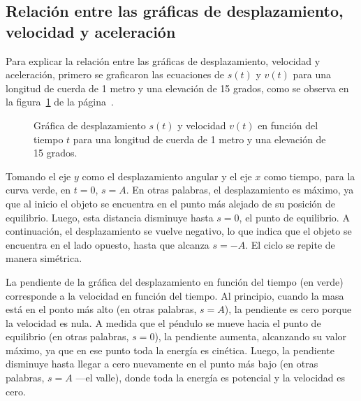 \documentclass[letterpaper]{report}
\numberwithin{table}{section}
\begin{document}
\subsection{Relación entre las gráficas de desplazamiento, velocidad y
aceleración}

Para explicar la relación entre las gráficas de desplazamiento, velocidad y
aceleración, primero se graficaron las ecuaciones de $s(t)$ y $v(t)$
para una longitud de cuerda de 1 metro y una elevación de 15 grados,
como se observa en la figura~\ref{fig:desplazamiento_velocidad} de la
página~\pageref{fig:desplazamiento_velocidad}.

\begin{figure}[ht]
  \centering
  \caption{Gráfica de desplazamiento $s(t)$ y velocidad $v(t)$ en
    función del tiempo $t$ para una
    longitud de cuerda de 1 metro y una elevación de 15
  grados.}\label{fig:desplazamiento_velocidad}
\end{figure}

Tomando el eje $y$ como el desplazamiento angular y el eje $x$ como
tiempo, para la curva verde, en $t=0$, $s=A$. En otras palabras, el
desplazamiento es máximo, ya que al inicio el objeto se encuentra en
el punto más alejado de su posición de equilibrio. Luego, esta
distancia disminuye hasta $s=0$, el punto de equilibrio. A
continuación, el desplazamiento se vuelve negativo, lo que indica que
el objeto se encuentra en el lado opuesto, hasta que alcanza $s=-A$.
El ciclo se repite de manera simétrica.

La pendiente de la gráfica del desplazamiento en función del tiempo
(en verde) corresponde a la velocidad en función del tiempo. Al
principio, cuando la masa está en el ponto más alto (en otras
palabras, $s=A$), la pendiente es cero porque la velocidad es nula. A
medida que el péndulo se mueve hacia el punto de equilibrio (en otras
palabras, $s=0$), la pendiente aumenta, alcanzando su valor máximo,
ya que en ese punto toda la energía es cinética. Luego, la pendiente
disminuye hasta llegar a cero nuevamente en el punto más bajo (en
otras palabras, $s=A$ —el valle), donde toda la energía es potencial
y la velocidad es cero.
\end{document}
